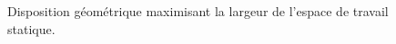 \begin{figure}[h]
\centering
{}
\caption{\label{chap1:fig:compare_pm} Disposition géométrique maximisant la largeur de l'espace de travail statique.}
\end{figure}
